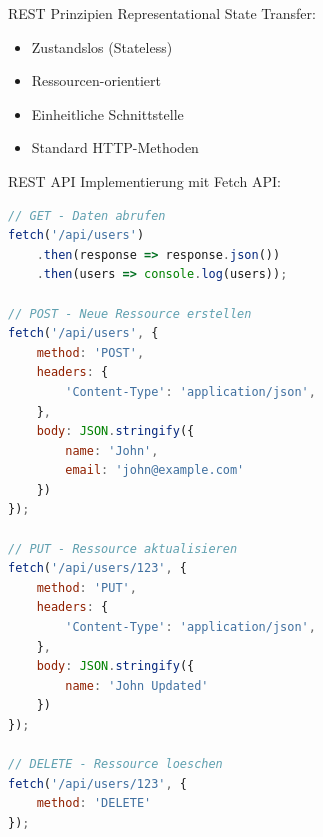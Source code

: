 \begin{definition}{REST Prinzipien}
    Representational State Transfer:
    \begin{itemize}
        \item Zustandslos (Stateless)
        \item Ressourcen-orientiert
        \item Einheitliche Schnittstelle
        \item Standard HTTP-Methoden
    \end{itemize}
\end{definition}

\begin{KR}{REST API Implementierung} mit Fetch API:
\begin{lstlisting}[language=JavaScript, style=basesmol]
// GET - Daten abrufen
fetch('/api/users')
    .then(response => response.json())
    .then(users => console.log(users));

// POST - Neue Ressource erstellen
fetch('/api/users', {
    method: 'POST',
    headers: {
        'Content-Type': 'application/json',
    },
    body: JSON.stringify({
        name: 'John',
        email: 'john@example.com'
    })
});

// PUT - Ressource aktualisieren
fetch('/api/users/123', {
    method: 'PUT',
    headers: {
        'Content-Type': 'application/json',
    },
    body: JSON.stringify({
        name: 'John Updated'
    })
});

// DELETE - Ressource loeschen
fetch('/api/users/123', {
    method: 'DELETE'
});
\end{lstlisting}
\end{KR}

